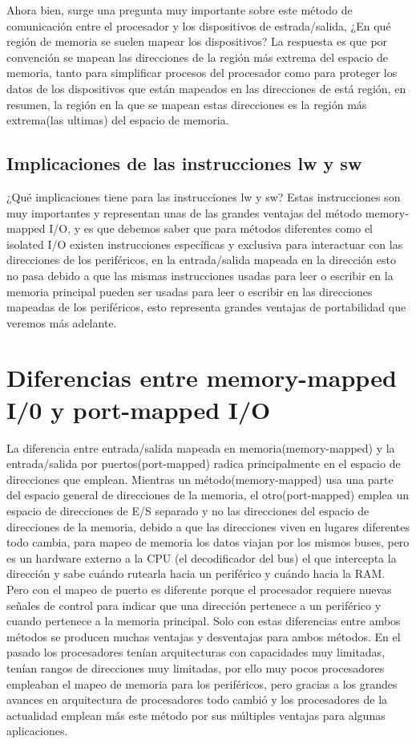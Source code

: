 \documentclass[12pt, a4paper]{article}
\begin{document}
Ahora bien, surge una pregunta muy importante sobre este método de comunicación entre el procesador y los dispositivos de estrada/salida, ¿En qué región de memoria se suelen mapear los dispositivos? La respuesta es que por convención se mapean las direcciones de la región más extrema del espacio de memoria, tanto para simplificar procesos del procesador como para proteger los datos de los dispositivos que están mapeados en las direcciones de está región, en resumen, la región en la que se mapean estas direcciones es la región más extrema(las ultimas) del espacio de memoria. 

\subsection{Implicaciones de las instrucciones lw y sw}
¿Qué implicaciones tiene para las instrucciones lw y sw? Estas instrucciones son muy importantes y representan unas de las grandes ventajas del método memory-mapped I/O, y es que debemos saber que para métodos diferentes como el isolated I/O existen instrucciones específicas y exclusiva para interactuar con las direcciones de los periféricos, en la entrada/salida mapeada en la dirección esto no pasa debido a que las mismas instrucciones usadas para leer o escribir en la memoria principal pueden ser usadas para leer o escribir en las direcciones mapeadas de los periféricos, esto representa grandes ventajas de portabilidad que veremos más adelante.

\section{Diferencias entre memory-mapped I/0 y port-mapped I/O}
La diferencia entre entrada/salida mapeada en memoria(memory-mapped) y la entrada/salida por puertos(port-mapped) radica principalmente en el espacio de direcciones que emplean. Mientras un método(memory-mapped) usa una parte del espacio general de direcciones de la memoria, el otro(port-mapped) emplea un espacio de direcciones de E/S separado y no las direcciones del espacio de direcciones de la memoria, debido a que las direcciones viven en lugares diferentes todo cambia, para mapeo de memoria los datos viajan por los mismos buses, pero es un hardware externo a la CPU (el decodificador del bus) el que intercepta la dirección y sabe cuándo rutearla hacia un periférico y cuándo hacia la RAM. Pero con el mapeo de puerto es diferente porque el procesador requiere nuevas señales de control para indicar que una dirección pertenece a un periférico y cuando pertenece a la memoria principal. Solo con estas diferencias entre ambos métodos se producen muchas ventajas y desventajas para ambos métodos.
\newpage
En el pasado los procesadores tenían arquitecturas con capacidades muy limitadas, tenían rangos de direcciones muy limitadas, por ello muy pocos procesadores empleaban el mapeo de memoria para los periféricos, pero gracias a los grandes avances en arquitectura de procesadores todo cambió y los procesadores de la actualidad emplean más este método por sus múltiples ventajas para algunas aplicaciones.
\end{document}
